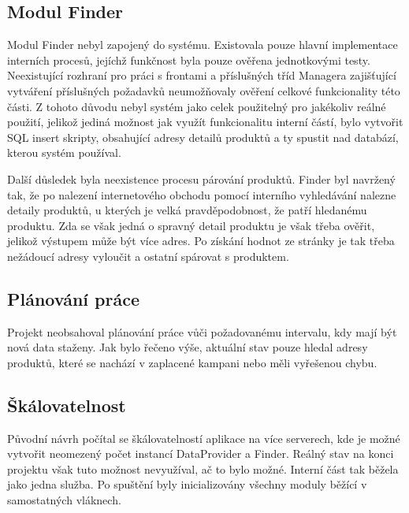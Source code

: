 \documentclass[thesis=B,czech]{FITthesis}[2012/06/26]
\begin{document}
\subsection{Modul Finder}
Modul Finder nebyl zapojený do systému. Existovala pouze hlavní implementace interních procesů, jejíchž funkčnost byla
pouze ověřena jednotkovými testy. Neexistující rozhraní pro práci s frontami a příslušných tříd Managera zajišťující vytváření příslušných požadavků
neumožňovaly ověření celkové funkcionality této části. Z tohoto důvodu nebyl systém jako celek použitelný pro jakékoliv reálné použití, jelikož
jediná možnost jak využít funkcionalitu interní částí, bylo vytvořit SQL insert skripty, obsahující adresy detailů produktů
a ty spustit nad databází, kterou systém používal.
\par
Další důsledek byla neexistence procesu párování produktů. Finder byl navržený tak, že po nalezení internetového obchodu
pomocí interního vyhledávání nalezne detaily produktů, u kterých je velká pravděpodobnost, že patří hledanému produktu.
Zda se však jedná o spravný detail produktu je však třeba ověřit, jelikož výstupem může být více adres. Po získání hodnot ze stránky je tak třeba nežádoucí adresy vyloučit a ostatní spárovat s produktem.
\subsection{Plánování práce}
Projekt neobsahoval plánování práce vůči požadovanému intervalu, kdy mají být nová data
staženy. Jak bylo řečeno výše, aktuální stav pouze hledal adresy produktů, které se nachází v zaplacené kampani nebo měli vyřešenou chybu.
\subsection{Škálovatelnost}
Původní návrh počítal se škálovatelností aplikace na více serverech, kde je možné vytvořit neomezený počet instancí DataProvider a Finder. Reálný stav
na konci projektu však tuto možnost nevyužíval, ač to bylo možné. Interní část tak běžela jako jedna služba. Po spuštění
byly inicializovány všechny moduly běžící v samostatných vláknech.
\end{document}
